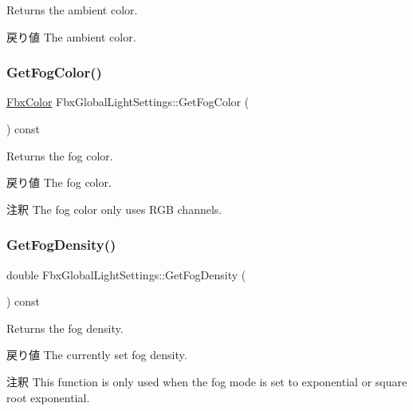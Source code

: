 Returns the ambient color. \begin{DoxyReturn}{戻り値}
The ambient color. 
\end{DoxyReturn}
\mbox{\label{class_fbx_global_light_settings_a78ab759ac52d0d618eb275a9149feedd}} 
\subsubsection{\texorpdfstring{Get\+Fog\+Color()}{GetFogColor()}}
{\footnotesize\ttfamily \hyperlink{class_fbx_color}{Fbx\+Color} Fbx\+Global\+Light\+Settings\+::\+Get\+Fog\+Color (\begin{DoxyParamCaption}{ }\end{DoxyParamCaption}) const}

Returns the fog color. \begin{DoxyReturn}{戻り値}
The fog color. 
\end{DoxyReturn}
\begin{DoxyRemark}{注釈}
The fog color only uses R\+GB channels. 
\end{DoxyRemark}
\mbox{\label{class_fbx_global_light_settings_ad69be94b5061ada689c5103f8b3c44c2}} 
\subsubsection{\texorpdfstring{Get\+Fog\+Density()}{GetFogDensity()}}
{\footnotesize\ttfamily double Fbx\+Global\+Light\+Settings\+::\+Get\+Fog\+Density (\begin{DoxyParamCaption}{ }\end{DoxyParamCaption}) const}

Returns the fog density. \begin{DoxyReturn}{戻り値}
The currently set fog density. 
\end{DoxyReturn}
\begin{DoxyRemark}{注釈}
This function is only used when the fog mode is set to exponential or square root exponential. 
\end{DoxyRemark}
\mbox{\label{class_fbx_global_light_settings_abceecba4b43b858168125d70c5d451ec}} 
